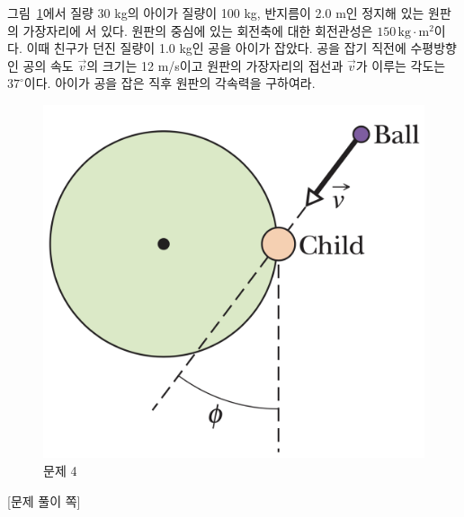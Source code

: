 \documentclass[floatfix,nofootinbib,superscriptaddress,fleqn,preprint]{revtex4}
\begin{document}
그림~\ref{fig:4}에서 질량 30 kg의 아이가 질량이 100 kg, 반지름이 2.0
m인 정지해 있는 원판의 가장자리에 서 있다. 원판의 중심에 있는 회전축에
대한 회전관성은 $150\,\mathrm{kg\cdot m^2}$이다. 이때 친구가 던진
질량이 1.0 kg인 공을 아이가 잡았다. 공을 잡기 직전에 수평방향인 공의
속도 $\vec{v}$의 크기는 12 m/s이고 원판의 가장자리의 접선과
$\vec{v}$가 이루는 각도는 $37^\circ$이다. 아이가 공을 잡은 직후 원판의
각속력을 구하여라. 
\begin{figure}[ht]
  \centering
\includegraphics[scale=0.25]{Qfig14-4-20220427.png} 
  \caption{문제 4}
  \label{fig:4}
\end{figure}
\newpage
{\color{gray} [문제 풀이 쪽]}

\newpage
\end{document}
